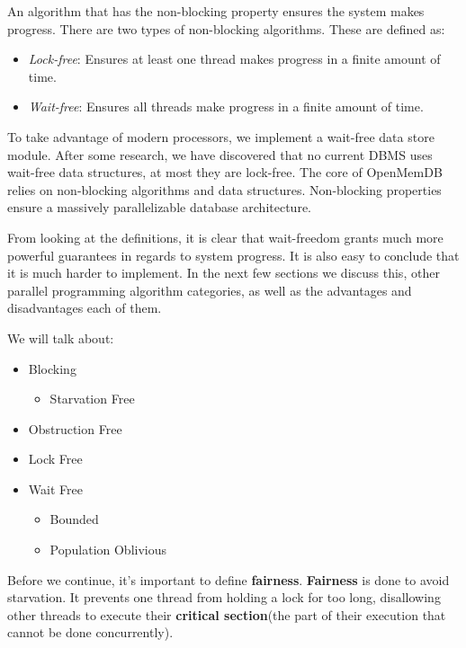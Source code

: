 \documentclass[letterpaper, 11pt]{article}
\begin{document}
\par\vspace{\baselineskip}
An algorithm that has the non-blocking property ensures the system makes progress. There are 
two types of non-blocking algorithms. These are defined as:
\begin{itemize}
	\item \textit{Lock-free}: Ensures at least one thread makes progress in a finite amount of time.
	\item \textit{Wait-free}: Ensures all threads make progress in a finite amount of time.
\end{itemize}
To take advantage of modern processors, we implement a wait-free data store module.
After some research, we have discovered that no current DBMS uses wait-free data
structures, at most they are lock-free. The core of OpenMemDB relies on non-blocking algorithms and data
structures. Non-blocking properties ensure a massively parallelizable database architecture.

\par\vspace{\baselineskip}

From looking at the definitions, it is clear that wait-freedom grants much more
powerful guarantees in regards to system progress. It is also easy to conclude that
it is much harder to implement. In the next few sections we discuss this, other parallel 
programming algorithm categories, as well as the advantages and disadvantages each of them.

We will talk about:

\begin{itemize}
	\item Blocking
	\begin{itemize}
		\item Starvation Free
	\end{itemize}
	\item Obstruction Free
	\item Lock Free
	\item Wait Free
	\begin{itemize}
		\item Bounded
		\item Population Oblivious
	\end{itemize}
\end{itemize}

\newpage

Before we continue, it's important to define {\bfseries fairness}. {\bfseries Fairness} 
is done to avoid starvation. It prevents one thread from holding a lock for too long, 
disallowing other threads to execute their {\bfseries critical section}(the part of 
their execution that cannot be done concurrently).
\end{document}

